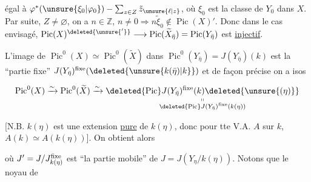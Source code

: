 égal à $\varphi^*(\unsure{\xi_0|\varphi_0})-\sum_{z\in Z}\tilde z_{\unsure{\ell|z}}$, où $\xi_0$ est la classe de
$Y_0$ dans $X$. Par suite,   $Z\ne\varnothing$, on
a $n\in\mathbb Z$, $n\ne0\Longrightarrow n\tilde\xi_0\notin\operatorname{Pic}(X)'$. Donc
dans le cas envisagé, $\operatorname{Pic}(X)^{\deleted{\unsure{'}}}\longrightarrow\operatorname{Pic}(\widetilde X_{\bar\eta})=\operatorname{Pic}(Y_{\bar\eta})$
est \uline{injectif}.

L’image de $\operatorname{Pic}^0(X)\simeq\operatorname{Pic}^0(\widetilde X)$ dans
 $\operatorname{Pic}^0(Y_{\bar\eta})=J(Y_{\bar\eta})(k)$ est la ``partie  fixe''
$J(Y_{\bar\eta})^{\mathrm{fixe}}(\deleted{\unsure{k(\bar\eta)|k}})$ et de façon précise on a  isos

\[
\operatorname{Pic}^0(X)\xrightarrow{\sim}\operatorname{Pic}^0(\widetilde X)\xrightarrow{\sim}
\underset{\substack{\shortparallel\\ \deleted{\operatorname{Pic}}J(Y_{\bar\eta})^{\rm fixe}(k(\eta))}}
{\deleted{\operatorname{Pic}}J(Y_{\bar\eta})^{\rm fixe}(k)\deleted{\unsure{(\eta)}}}
\]

[N.B.  $k(\eta)$ est
une extension \uline{pure} de $k(\eta)$, donc pour tte
V.A. $A$ sur $k$, $A(k)\simeq A(k(\eta))$]. On obtient
alors


où $J'=J/J^{\rm fixe}_{k(\eta)}$ est ``la partie mobile'' de $J=
J(Y_\eta/k(\eta))$. Notons que le noyau de
